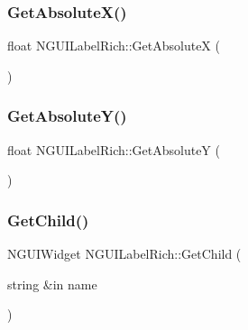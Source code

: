 \hypertarget{class_n_g_u_i_label_rich_aa8abffb46ca693ecf0b861c563cdea60}{}\label{class_n_g_u_i_label_rich_aa8abffb46ca693ecf0b861c563cdea60} 
\subsubsection{\texorpdfstring{Get\+Absolute\+X()}{GetAbsoluteX()}}
{\footnotesize\ttfamily float N\+G\+U\+I\+Label\+Rich\+::\+Get\+AbsoluteX (\begin{DoxyParamCaption}{ }\end{DoxyParamCaption})}

\hypertarget{class_n_g_u_i_label_rich_a86a2f8a28c577f6dcf81557fa2f994a7}{}\label{class_n_g_u_i_label_rich_a86a2f8a28c577f6dcf81557fa2f994a7} 
\subsubsection{\texorpdfstring{Get\+Absolute\+Y()}{GetAbsoluteY()}}
{\footnotesize\ttfamily float N\+G\+U\+I\+Label\+Rich\+::\+Get\+AbsoluteY (\begin{DoxyParamCaption}{ }\end{DoxyParamCaption})}

\hypertarget{class_n_g_u_i_label_rich_a23f37ba6fdc4469be27c94e27536ea67}{}\label{class_n_g_u_i_label_rich_a23f37ba6fdc4469be27c94e27536ea67} 
\subsubsection{\texorpdfstring{Get\+Child()}{GetChild()}\hspace{0.1cm}{\footnotesize\ttfamily [1/2]}}
{\footnotesize\ttfamily N\+G\+U\+I\+Widget N\+G\+U\+I\+Label\+Rich\+::\+Get\+Child (\begin{DoxyParamCaption}\item[{string \&in}]{name }\end{DoxyParamCaption})}

\hypertarget{class_n_g_u_i_label_rich_a9af08bfc73ae701b01e7312343ce29de}{}\label{class_n_g_u_i_label_rich_a9af08bfc73ae701b01e7312343ce29de} 
